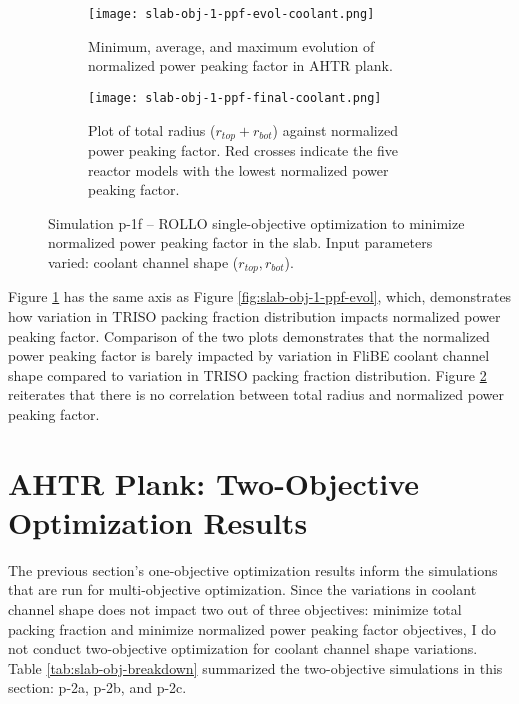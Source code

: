 \begin{figure}[htbp]
    \centering
    \begin{subfigure}{\textwidth}
        \texttt{[image: slab-obj-1-ppf-evol-coolant.png]}
        \caption{Minimum, average, and maximum evolution of normalized power 
        peaking factor in AHTR plank.}
        \label{fig:slab-obj-1-ppf-evol-coolant} 
    \end{subfigure}
    \begin{subfigure}{\textwidth}
        \texttt{[image: slab-obj-1-ppf-final-coolant.png]}
        \caption{Plot of total radius ($r_{top} + r_{bot}$) against normalized 
        power peaking factor. Red crosses indicate the five reactor models with the 
        lowest normalized power peaking factor.}
        \label{fig:slab-obj-1-ppf-final-coolant} 
    \end{subfigure}
    \caption{Simulation p-1f -- ROLLO single-objective optimization to minimize normalized power 
    peaking factor in the slab. Input parameters varied: coolant channel shape 
    ($r_{top}, r_{bot}$).}
    \label{fig:slab-obj-1-ppf-coolant}
\end{figure}
Figure \ref{fig:slab-obj-1-ppf-evol-coolant} has the same axis as Figure 
\ref{fig:slab-obj-1-ppf-evol}, which, demonstrates how variation in TRISO packing fraction 
distribution impacts normalized power peaking factor. 
Comparison of the two plots demonstrates that the normalized power
peaking factor is barely impacted by variation in FliBE coolant channel shape compared 
to variation in TRISO packing fraction distribution.
Figure \ref{fig:slab-obj-1-ppf-final-coolant} reiterates that there is no correlation 
between total radius and normalized power peaking factor. 

\pagebreak
\section{AHTR Plank: Two-Objective Optimization Results}
The previous section's one-objective optimization results inform the simulations that 
are run for multi-objective optimization. 
Since the variations in coolant channel shape does not impact two out of three objectives: 
minimize total packing fraction and minimize normalized power peaking factor 
objectives, I do not conduct two-objective optimization for coolant channel shape 
variations.  
Table \ref{tab:slab-obj-breakdown} summarized the two-objective simulations in this 
section: p-2a, p-2b, and p-2c.

